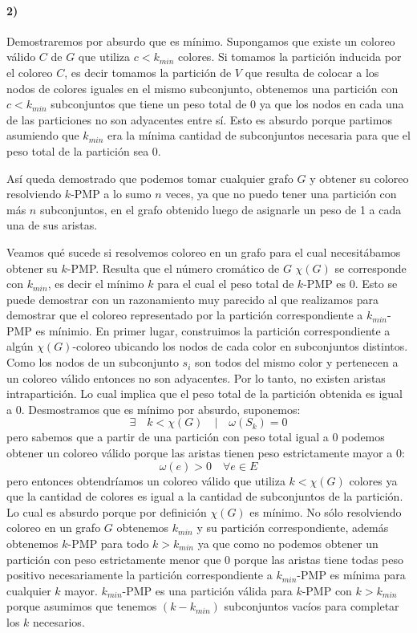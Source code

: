 \paragraph{2)}
Demostraremos por absurdo que es mínimo. Supongamos que existe un coloreo válido $C$ de $G$ que utiliza $c < k_{min}$ colores.
Si tomamos la partición inducida por el coloreo $C$, es decir tomamos la partición de $V$ que resulta de colocar a los nodos de
colores iguales en el mismo subconjunto, obtenemos una partición con $c < k_{min}$ subconjuntos que tiene un peso total de 0 ya que
los nodos en cada una de las particiones no son adyacentes entre sí. Esto es absurdo porque partimos asumiendo que $k_{min}$ era
la mínima cantidad de subconjuntos necesaria para que el peso total de la partición sea 0.

Así queda demostrado que podemos tomar cualquier grafo $G$ y obtener su coloreo resolviendo $k$-PMP a lo sumo $n$ veces, ya que no
puedo tener una partición con más $n$ subconjuntos, en el grafo obtenido luego de asignarle un peso de 1 a cada una de sus aristas.

Veamos qué sucede si resolvemos coloreo en un grafo para el cual necesitábamos obtener su $k$-PMP. Resulta que el número cromático de 
$G$ $\chi(G)$ se corresponde con $k_{min}$, es decir el mínimo $k$ para el cual el peso total de $k$-PMP es 0. Esto se puede demostrar
con un razonamiento muy parecido al que realizamos para demostrar que el coloreo representado por la partición correspondiente a
$k_{min}$-PMP es mínimio. En primer lugar, construimos la partición correspondiente a algún $\chi(G)$-coloreo ubicando los nodos
de cada color en subconjuntos distintos. Como los nodos de un subconjunto $s_i$ son todos del mismo color y pertenecen a un coloreo válido
entonces no son adyacentes. Por lo tanto, no existen aristas intrapartición. Lo cual implica que el peso total de la partición obtenida
es igual a 0. Desmostramos que es mínimo por absurdo, suponemos:
\begin{displaymath}
  \exists \quad k < \chi(G) \quad | \quad \omega(S_{k}) = 0
\end{displaymath}
pero sabemos que a partir de una partición con peso total igual a 0 podemos obtener un coloreo válido porque las aristas tienen peso 
estrictamente mayor a 0:
\begin{displaymath}
  \omega(e) > 0 \quad \forall e \in E
\end{displaymath}
pero entonces obtendríamos un coloreo válido que utiliza $k < \chi(G)$ colores ya que la cantidad de colores es igual a la cantidad de 
subconjuntos de la partición. Lo cual es absurdo porque por definición $\chi(G)$ es mínimo.
No sólo resolviendo coloreo en un grafo $G$ obtenemos $k_{min}$ y su partición correspondiente, además obtenemos $k$-PMP para todo
$k > k_{min}$ ya que como no podemos obtener un partición con peso estrictamente menor que 0 porque las aristas tiene todas
peso positivo necesariamente la partición correspondiente a $k_{min}$-PMP es mínima para cualquier $k$ mayor. $k_{min}$-PMP
es una partición válida para $k$-PMP con $k > k_{min}$ porque asumimos que tenemos $(k-k_{min})$ subconjuntos vacíos para completar
los $k$ necesarios.


